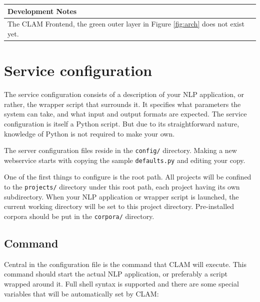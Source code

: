 \documentclass[a4paper,12pt]{report}
\newenvironment{devnotes}
{\newpage
\begin{center}
    \begin{tabular}[h!]{|p{0.8\textwidth}|}
    \hline
    {\bf Development Notes}\\\hline}
{   \\\hline
    \end{tabular}
\end{center}}
\begin{document}
\begin{devnotes}
The CLAM Frontend, the green outer layer in Figure \ref{fig:arch} does not exist yet.
\end{devnotes}


\section{Service configuration}

The service configuration consists of a description of your NLP application, or rather, the wrapper script that surrounds it. It specifies what parameters the system can take, and what input and output formats are expected. The service configuration is itself a Python script. But due to its straightforward nature, knowledge of Python is not required to make your own.

The server configuration files reside in the \texttt{config/} directory. Making a new webservice starts with copying the sample \texttt{defaults.py} and editing your copy.

One of the first things to configure is the root path. All projects will be confined to the \texttt{projects/} directory under this root path, each project having its own subdirectory. When your NLP application or wrapper script is launched, the current working directory will be set to this project directory. Pre-installed corpora should be put in the \texttt{corpora/} directory. 
 
\subsection{Command}
\label{sec:command}

Central in the configuration file is the command that CLAM will execute. This command should start the actual NLP application, or preferably a script wrapped around it. Full shell syntax is supported and there are some special variables that will be automatically set by CLAM:
\end{document}
